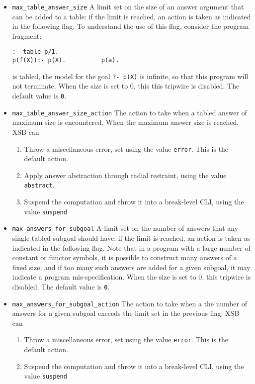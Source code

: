 \begin{description}
\begin{itemize}
\item {\tt max\_table\_answer\_size} A limit set on the size of an
  answer argument that can be added to a table: if the limit is
  reached, an action is taken as indicated in the following flag.  To
  understand the use of this flag, consider the program fragment:
\begin{verbatim}
:- table p/1.
p(f(X)):- p(X).          p(a).
\end{verbatim}
  is tabled, the model for the goal {\tt ?- p(X)} is infinite, so that
  this program will not terminate.  When the size is set to 0, this
  this tripwire is disabled.  The default value is {\tt 0}.

\item {\tt max\_table\_answer\_size\_action} The action to take when a
  tabled answer of maximum size is encountered.  When the maximum
  answer size is reached, XSB can
\begin{enumerate}
\item Throw a miscellaneous error, set using the value {\tt error}.
  This is the default action.
%
\item Apply answer abstraction through radial restraint, using the
  value {\tt abstract}.
%
\item Suspend the computation and throw it into a break-level CLI,
  using the value {\tt suspend}
%
\end{enumerate}

\item {\tt max\_answers\_for\_subgoal} A limit set on the number of
  answers that any single tabled subgoal should have: if the limit is
  reached, an action is taken as indicated in the following flag.
  Note that in a program with a large number of constant or functor
  symbols, it is possible to construct many answers of a
  fixed size; and if too many such answers are added for a given
  subgoal, it may indicate a program mis-specification.  When the size
  is set to 0, this tripwire is disabled.  The default value is
  {\tt 0}.

\item {\tt max\_answers\_for\_subgoal\_action} The action to take when
  a the number of answers for a given subgoal exceeds the limit set in
  the previous flag.  XSB can
\begin{enumerate}
\item Throw a miscellaneous error, set using the value {\tt error}.
  This is the default action.
%
\item Suspend the computation and throw it into a break-level CLI,
  using the value {\tt suspend}
%
\end{enumerate}


\end{itemize}
\end{description}
